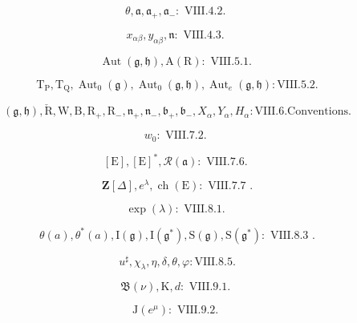 \[
\theta , \mathfrak {a}, \mathfrak {a} _ {+}, \mathfrak {a} _ {-}: \text {   VIII.4.2.   }
\]

\[
x _ {\alpha \beta}, y _ {\alpha \beta}, \mathfrak {n}: \text {   VIII.4.3.   }
\]

\[
\operatorname{Aut} (\mathfrak {g}, \mathfrak {h}), \mathrm{A} (\mathrm{R}): \text {   VIII.5.1.   }
\]

\[
\mathrm{T} _ {\mathrm{P}}, \mathrm{T} _ {\mathrm{Q}}, \operatorname{Aut} _ {0} (\mathfrak {g}), \operatorname{Aut} _ {0} (\mathfrak {g}, \mathfrak {h}), \operatorname{Aut} _ {e} (\mathfrak {g}, \mathfrak {h}): \text {VIII.5.2}.
\]

\[
(\mathfrak {g}, \mathfrak {h}), \check {\mathrm{R}}, \mathrm{W}, \mathrm{B}, \mathrm{R} _ {+}, \mathrm{R} _ {-}, \mathfrak {n} _ {+}, \mathfrak {n} _ {-}, \mathfrak {b} _ {+}, \mathfrak {b} _ {-}, X _ {\alpha}, Y _ {\alpha}, H _ {\alpha}: \text {VIII.6.Conventions.}
\]

\[
w _ {0} \colon \text {   VIII.7.2.   }
\]

\[
[ \mathrm{E} ], [ \mathrm{E} ] ^ {*}, \mathscr {R} (\mathfrak {a}): \text {   VIII.7.6.   }
\]

\[
\mathbf {Z} [ \Delta ], e ^ {\lambda}, \operatorname{ch} (\mathrm{E}) \colon \text { VIII.7.7 }.
\]

\[
\exp (\lambda): \text {   VIII.8.1.   }
\]

\[
\theta (a), \theta^ {*} (a), \mathrm{I} (\mathfrak {g}), \mathrm{I} (\mathfrak {g} ^ {*}), \mathrm{S} (\mathfrak {g}), \mathrm{S} (\mathfrak {g} ^ {*}) \colon \text { VIII.8.3 }.
\]

\[
u ^ {\sharp}, \chi_ {\lambda}, \eta , \delta , \theta , \varphi : \mathrm{VIII.8.5}.
\]

\[
\mathfrak {B} (\nu), \mathrm{K}, d: \text {   VIII.9.1.   }
\]

\[
\mathrm{J} (e ^ {\mu}) \colon \text { VIII.9.2. }
\]

